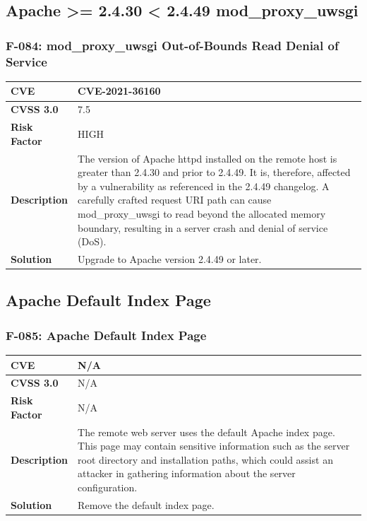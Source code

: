%
%
\subsection{Apache >= 2.4.30 < 2.4.49 mod\_proxy\_uwsgi}

\subsubsection{F-084: mod\_proxy\_uwsgi Out-of-Bounds Read Denial of Service}
\begin{tabular}{|p{2.8cm}|p{12.2cm}|}
\hline
\textbf{CVE} & CVE-2021-36160 \\ \hline
\textbf{CVSS 3.0} & 7.5 \\ \hline
\textbf{Risk Factor} & HIGH \\ \hline
\textbf{Description} & The version of Apache httpd installed on the remote host is greater than 2.4.30 and prior to 2.4.49. It is, therefore, affected by a vulnerability as referenced in the 2.4.49 changelog. A carefully crafted request URI path can cause mod\_proxy\_uwsgi to read beyond the allocated memory boundary, resulting in a server crash and denial of service (DoS). \\ \hline
\textbf{Solution} & Upgrade to Apache version 2.4.49 or later. \\ \hline
\end{tabular}

%
%
\subsection{Apache Default Index Page}

\subsubsection{F-085: Apache Default Index Page}
\begin{tabular}{|p{2.8cm}|p{12.2cm}|}
\hline
\textbf{CVE} & N/A \\ \hline
\textbf{CVSS 3.0} & N/A \\ \hline
\textbf{Risk Factor} & N/A \\ \hline
\textbf{Description} & The remote web server uses the default Apache index page. This page may contain sensitive information such as the server root directory and installation paths, which could assist an attacker in gathering information about the server configuration. \\ \hline
\textbf{Solution} & Remove the default index page. \\ \hline
\end{tabular}

